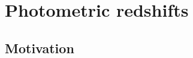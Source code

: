 





\chapter{Photometric redshifts}\label{chapter:photometric_redshifts}

\ifpdf
    \graphicspath{{Chapter3/Figs/Raster/}{Chapter3/Figs/PDF/}{Chapter3/Figs/}}
\else
    \graphicspath{{Chapter3/Figs/Vector/}{Chapter3/Figs/}}
\fi

\section{Motivation}\label{section:motivation}

